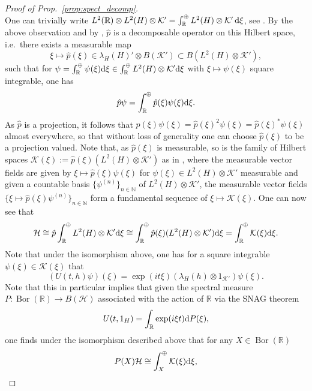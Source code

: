 \documentclass[sn-mathphys-num]{sn-jnl}%
\newcommand{\RR}{\mathbb{R}}
\newcommand{\HH}{\mathcal{H}}
\newcommand{\KK}{\mathcal{K}}
\DeclareMathOperator{\Bor}{Bor}
\newcommand{\diff}{\textup{d}}
\numberwithin{equation}{section}
\theoremstyle{thmstyleone}%
\theoremstyle{thmstyletwo}%
\theoremstyle{thmstylethree}%
\begin{document}
\begin{proof}[Proof of Prop.\ \ref{prop:spect_decomp}]
\begin{equation}
    \end{equation}
    One can trivially write $L^2(\RR)\otimes L^2(H)\otimes \KK'=\int_\RR^\oplus L^2(H)\otimes \KK'\,\diff \xi$, see \cite[Ch.\ IV.8]{Takesaki2001}. By the above observation and by \cite[Cor.\ IV.8.16]{Takesaki2001}, $\hat{p}$ is a decomposable operator on this Hilbert space, i.e.\ there exists a measurable map
    \begin{equation}
    \xi\mapsto \hat{p}(\xi)\in \lambda_H(H)' \otimes B(\KK') \subset B(L^2(H)\otimes \KK') ,
    \end{equation}
    such that for $\psi =\int_\RR^\oplus \psi(\xi)\diff \xi \in \int_\RR^\oplus L^2(H)\otimes \KK'\diff \xi$ with $\xi\mapsto\psi(\xi)$ square integrable, one has 
    \begin{equation}\hat{p}\psi=\int_\RR^\oplus \hat{p}(\xi)\psi(\xi)\diff \xi.
    \end{equation}
    As $\hat{p}$ is a projection, it follows that $\hat{p}(\xi)\psi(\xi)=\hat{p}(\xi)^2\psi(\xi)=\hat{p}(\xi)^*\psi(\xi)$ almost everywhere, so that without loss of generality one can choose $\hat{p}(\xi)$ to be a projection valued.
    Note that, as $\hat{p}(\xi)$ is measurable, so is the family of Hilbert spaces $\KK(\xi):=\hat{p}(\xi)(L^2(H)\otimes \KK')$ as in \cite[Def.\ IV.8.9]{Takesaki2001}, where the measurable vector fields are given by $\xi\mapsto \hat{p}(\xi)\psi(\xi)$ for $\psi(\xi)\in L^2(H)\otimes \KK'$ measurable and given a countable basis $\{\psi^{(n)}\}_{n\in \mathbb{N}}$ of $L^2(H)\otimes \KK'$, the measurable vector fields $\{\xi\mapsto \hat{p}(\xi)\psi^{(n)}\}_{n\in \mathbb{N}}$ form a fundamental sequence of $\xi\mapsto \KK(\xi)$. One can now see that
    \begin{equation}
         \HH\cong \hat{p}\int_{\RR}^{\oplus}L^2(H)\otimes \KK'\diff\xi\cong \int_{\RR}^{\oplus}\hat{p}(\xi)(L^2(H)\otimes \KK')\diff\xi= \int_{\RR}^{\oplus}\KK(\xi)\diff\xi.
    \end{equation}
    Note that under the isomorphism above, one has for a square integrable $\psi(\xi)\in \KK(\xi)$ that \begin{equation}
        (U(t,h)\psi)(\xi)=\exp(it\xi)(\lambda_{H}(h)\otimes 1_{\KK'})\psi(\xi).
    \end{equation}
    Note that this in particular implies that given the spectral measure $P:\Bor(\RR)\to B(\HH)$ associated with the action of $\RR$ via the SNAG theorem
    \begin{equation}
        U(t,1_H)=\int_\RR \exp(i\xi t)\diff P(\xi),
    \end{equation}
    one finds under the isomorphism described above that for any $X\in \Bor(\RR)$
    \begin{equation}
        P(X)\HH\cong \int_X^\oplus \KK(\xi)\diff \xi,
    \end{equation}


\end{proof}
\end{document}
